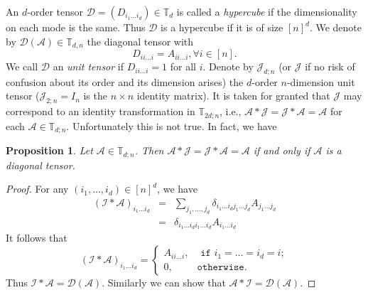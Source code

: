 \documentclass[11pt, oneside]{article}  %
\newtheorem{prop}[thm]{Proposition}
\newcommand{\TT}{\mathbb{T}}
\newcommand{\A}{\mathcal{A}}
\newcommand{\caD}{\mathcal{D}}
\newcommand{\caI}{\mathcal{I}}
\newcommand{\caJ}{\mathcal{J}}
\newcommand{\beyy}{\begin{eqnarray*}}
\newcommand{\eeyy}{\end{eqnarray*}}
\begin{document}
An $d$-order tensor $\caD=(D_{i_{1}\ldots i_{d}})\in\TT_{d}$ is called a \emph{hypercube} if the dimensionality on each mode is the same. 
Thus $\caD$ is a hypercube if it is of size $[n]^{d}$.  We denote by $\caD(\A)\in\TT_{d,n}$ the diagonal tensor with 
\[ D_{ii\ldots i}=A_{ii\ldots i}, \forall i\in [n].    \]
We call $\caD$ an \emph{unit tensor} if  $D_{ii\ldots i}=1$ for all $i$.  Denote by $\caJ_{d;n}$ (or $\caJ$ if no risk of confusion about its order and its 
dimension arises) the $d$-order $n$-dimension unit tensor ($\caJ_{2;n}= I_{n}$ is the $n\times n$ identity matrix).  It is taken for granted that $\caJ$ 
may correspond to an identity transformation in $\TT_{2d;n}$, i.e.,  $\A\ast\caJ =\caJ \ast \A= \A$ for each $\A\in\TT_{d;n}$.  Unfortunately this is not true.  
In fact, we have 
\begin{prop}\label{prop2-3:unit-t}
Let $\A\in\TT_{d;n}$. Then $\A\ast\caJ = \caJ \ast \A=\A$ if and only if  $\A$ is a diagonal tensor.
\end{prop} 
\begin{proof}
For any $(i_{1},\ldots,i_{d})\in [n]^{d}$, we have  
\beyy 
(\caI\ast \A)_{i_{1}\ldots i_{d}}
&=& \sum_{j_{1},\ldots,j_{d}} \delta_{i_{1}\ldots i_{d}j_{1}\ldots j_{d}} A_{j_{1}\ldots j_{d}}\\
&=& \delta_{i_{1}\ldots i_{d}i_{1}\ldots i_{d}} A_{i_{1}\ldots i_{d}}
\eeyy 
It follows that 
\[ (\caI\ast \A)_{i_{1}\ldots i_{d}} 
=\begin{cases} A_{ii\ldots i}, &\texttt{ if  } i_{1}=\ldots =i_{d}=i;\\  0, & \texttt{otherwise}. \end{cases}
\]
Thus $\caI\ast \A = \caD(\A) $.  Similarly we can show that $\A\ast\caI = \caD(\A) $. 
\end{proof}
\end{document}
